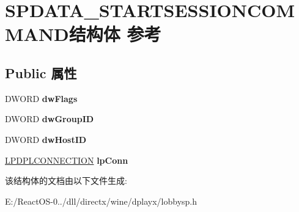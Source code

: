 \hypertarget{struct_s_p_d_a_t_a___s_t_a_r_t_s_e_s_s_i_o_n_c_o_m_m_a_n_d}{}\section{S\+P\+D\+A\+T\+A\+\_\+\+S\+T\+A\+R\+T\+S\+E\+S\+S\+I\+O\+N\+C\+O\+M\+M\+A\+N\+D结构体 参考}
\label{struct_s_p_d_a_t_a___s_t_a_r_t_s_e_s_s_i_o_n_c_o_m_m_a_n_d}
\subsection*{Public 属性}
\begin{DoxyCompactItemize}
\item 
\mbox{\label{struct_s_p_d_a_t_a___s_t_a_r_t_s_e_s_s_i_o_n_c_o_m_m_a_n_d_a92076ca7d276d602f71d284682eee4ab}} 
D\+W\+O\+RD {\bfseries dw\+Flags}
\item 
\mbox{\label{struct_s_p_d_a_t_a___s_t_a_r_t_s_e_s_s_i_o_n_c_o_m_m_a_n_d_ac1a67c952c99c20097575efb989ebbed}} 
D\+W\+O\+RD {\bfseries dw\+Group\+ID}
\item 
\mbox{\label{struct_s_p_d_a_t_a___s_t_a_r_t_s_e_s_s_i_o_n_c_o_m_m_a_n_d_aeede4bc7f886f416104e72c1091df69c}} 
D\+W\+O\+RD {\bfseries dw\+Host\+ID}
\item 
\mbox{\label{struct_s_p_d_a_t_a___s_t_a_r_t_s_e_s_s_i_o_n_c_o_m_m_a_n_d_a998f70e0029e988fba15141a62c2edf7}} 
\hyperlink{structtag_d_p_l_c_o_n_n_e_c_t_i_o_n}{L\+P\+D\+P\+L\+C\+O\+N\+N\+E\+C\+T\+I\+ON} {\bfseries lp\+Conn}
\end{DoxyCompactItemize}


该结构体的文档由以下文件生成\+:\begin{DoxyCompactItemize}
\item 
E\+:/\+React\+O\+S-\/0../dll/directx/wine/dplayx/lobbysp.\+h\end{DoxyCompactItemize}
